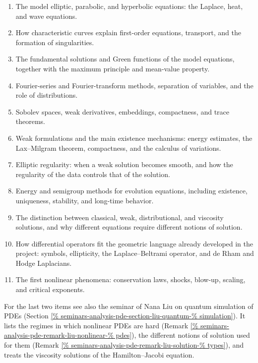 \begin{enumerate}
\item The model elliptic, parabolic, and
hyperbolic equations: the Laplace, heat,
and wave equations.

\item How characteristic curves explain
first-order equations, transport, and the
formation of singularities.

\item The fundamental solutions and Green
functions of the model equations, together
with the maximum principle and mean-value
property.

\item Fourier-series and Fourier-transform
methods, separation of variables, and the
role of distributions.

\item Sobolev spaces, weak derivatives,
embeddings, compactness, and trace
theorems.

\item Weak formulations and the main
existence mechanisms: energy estimates,
the Lax--Milgram theorem, compactness, and
the calculus of variations.

\item Elliptic regularity: when a weak
solution becomes smooth, and how the
regularity of the data controls that of
the solution.

\item Energy and semigroup methods for
evolution equations, including existence,
uniqueness, stability, and long-time
behavior.

\item The distinction between classical,
weak, distributional, and viscosity
solutions, and why different equations
require different notions of solution.

\item How differential operators fit the
geometric language already developed in
the project: symbols, ellipticity, the
Laplace--Beltrami operator, and de Rham
and Hodge Laplacians.

\item The first nonlinear phenomena:
conservation laws, shocks, blow-up,
scaling, and critical exponents.
\end{enumerate}

For the last two items see also the seminar
of Nana Liu on quantum simulation of PDEs
(Section
\ref{%
seminars-analysis-pde-section-liu-quantum-%
simulation}). It lists the regimes in which
nonlinear PDEs are hard (Remark
\ref{%
seminars-analysis-pde-remark-liu-nonlinear-%
pdes}), the different notions of solution
used for them (Remark
\ref{%
seminars-analysis-pde-remark-liu-solution-%
types}), and treats the viscosity solutions
of the Hamilton--Jacobi equation.






